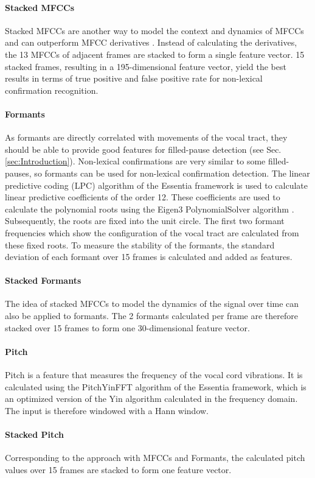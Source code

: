 \documentclass[letterpaper]{article}
\begin{document}
\paragraph{Stacked MFCCs}
Stacked MFCCs are another way to model the context and dynamics of MFCCs and can outperform MFCC derivatives \cite{Heck2013}. Instead of calculating the derivatives, the 13 MFCCs of adjacent frames are stacked to form a single feature vector. 15 stacked frames, resulting in a 195-dimensional feature vector, yield the best results in terms of true positive and false positive rate for non-lexical confirmation recognition.
\paragraph{Formants}
As formants are directly correlated with movements of the vocal tract, they should be able to provide good features for filled-pause detection (see Sec. \ref{sec:Introduction}). Non-lexical confirmations are very similar to some filled-pauses, so formants can be used for non-lexical confirmation detection. The linear predictive coding (LPC) algorithm of the Essentia framework is used to calculate linear predictive coefficients of the order 12. These coefficients are used to calculate the polynomial roots using the Eigen3 PolynomialSolver algorithm \cite{eigenweb}. Subsequently, the roots are fixed into the unit circle. The first two formant frequencies which show the configuration of the vocal tract are calculated from these fixed roots.
To measure the stability of the formants, the standard deviation of each formant over 15 frames is calculated and added as features.
\paragraph{Stacked Formants}
The idea of stacked MFCCs to model the dynamics of the signal over time can also be applied to formants. The 2 formants calculated per frame are therefore stacked over 15 frames to form one 30-dimensional feature vector.
\paragraph{Pitch}
Pitch is a feature that measures the frequency of the vocal cord vibrations.
It is calculated using the PitchYinFFT algorithm \cite{paul2007a} of the Essentia framework, which is an optimized version of the Yin algorithm calculated in the frequency domain. The input is therefore windowed with a Hann window.
\paragraph{Stacked Pitch}
Corresponding to the approach with MFCCs and Formants, the calculated pitch values over 15 frames are stacked to form one feature vector.
\end{document}
